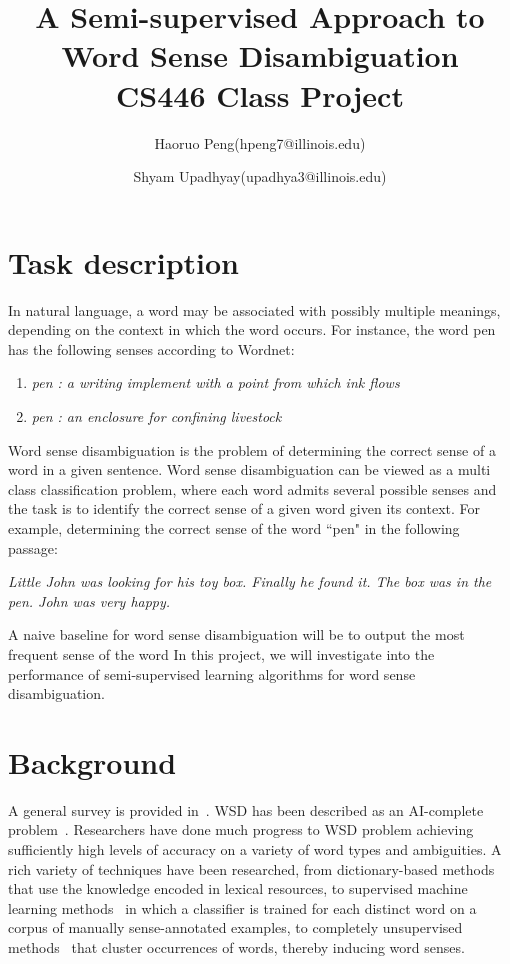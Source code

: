 \documentclass[11pt,letterpaper]{article}
\begin{document}
\title{A Semi-supervised Approach to Word Sense Disambiguation \\ \small{CS446 Class Project}}
\author{Haoruo Peng(hpeng7@illinois.edu) \and Shyam Upadhyay(upadhya3@illinois.edu)}
\maketitle
\section*{Task description}
In natural language, a word may be associated with possibly multiple meanings, depending on the context in which the word occurs. For instance, the word pen has the following senses according to Wordnet:
\begin{enumerate}
\item \emph{pen : a writing implement with a point from which ink flows}
\item \emph{pen : an enclosure for confining livestock}
\end{enumerate}
Word sense disambiguation is the problem of determining the correct sense of a word in a given sentence. Word sense disambiguation can be viewed as a multi class classification problem, where each word admits several possible senses and the task is to identify the correct sense of a given word given its context. For example, determining the correct sense of the word ``pen" in the following passage:

\emph{Little John was looking for his toy box. Finally he found it. The box was in the pen. John was very happy.}

A naive baseline for word sense disambiguation will be to output the most frequent sense of the word In this project, we will investigate into the performance of semi-supervised learning algorithms for word sense disambiguation.

\section*{Background}
A general survey is provided in~\cite{navigli2009word}. WSD has been described as an AI-complete problem~\cite{mallery1988thinking}. Researchers have done much progress to WSD problem achieving sufficiently high levels of accuracy on a variety of word types and ambiguities. A rich variety of techniques have been researched, from dictionary-based methods~\cite{mihalcea2007using} that use the knowledge encoded in lexical resources, to supervised machine learning methods~\cite{manning1999foundations} in which a classifier is trained for each distinct word on a corpus of manually sense-annotated examples, to completely unsupervised methods~\cite{yarowsky1995unsupervised} that cluster occurrences of words, thereby inducing word senses.
\end{document}
